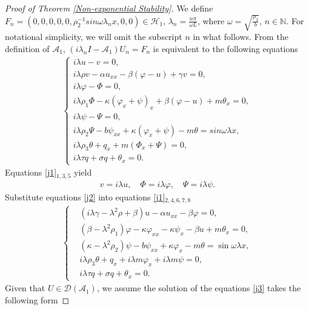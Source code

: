 \documentclass[11pt,reqno]{article}
\begin{document}
\begin{proof}[Proof of Theorem \ref{Non-exponential Stability}]
  	We define $F_n=(0,0,0,0,0,\rho_2 ^{-1}sin\omega \lambda_n x,0,0) \in \mathcal{H}_1$, $\lambda_n = \frac{n\pi}{\omega L}$, where $\omega=\sqrt{\frac{\rho_2}{b}}$, $n \in \mathbb{N}$. For notational simplicity, we will omit the subscript $n$ in what follows. From the definition of $\mathcal{A}_1$, $(i\lambda_n I-\mathcal{A}_1)U_n = F_n$ is equivalent to the following equations
  	\begin{align}\label{j1}
  		\begin{cases}
  			i\lambda u - v=0,\\
  			i\lambda \rho v -\alpha u_{xx}-\beta(\varphi - u)+ \gamma v =0,\\
  			i\lambda\varphi - \Phi =0,\\
  			i\lambda\rho_1 \Phi - \kappa(\varphi_{x}+\psi)_x + \beta (\varphi - u) +  m\theta_{x}=0  ,\\
  			i\lambda \psi - \Psi =0 ,\\
  			i\lambda \rho_2 \Psi - b \psi_{xx} + \kappa(\varphi_{x} + \psi) - m\theta =sin\omega\lambda x ,\\
  			i\lambda \rho_3 \theta + q_x + m(\Phi_{x} + \Psi) =0 ,\\
  			i\lambda \tau q + \sigma q + \theta_x = 0 .
  		\end{cases}
  	\end{align}
  	Equations \eqref{j1}$_{1,3,5}$ yield
  	\begin{align}\label{j2}
  		 v = i \lambda u, \quad \Phi = i \lambda \varphi, \quad \Psi = i \lambda \psi .
  	\end{align}
  	Substitute equations \eqref{j2} into equations \eqref{j1}$_{2,4,6,7,8}$
  	\begin{align}\label{j3}
  		\begin{cases}
  			& (i \lambda \gamma - \lambda^2 \rho + \beta) u - \alpha u_{xx} - \beta \varphi = 0, \\
  			&(\beta - \lambda^2 \rho_1) \varphi - \kappa \varphi_{xx} - \kappa \psi_x - \beta u + m \theta_x = 0, \\
  			&(\kappa - \lambda^2 \rho_2) \psi - b \psi_{xx} + \kappa \varphi_x - m \theta = \sin \omega \lambda x,\\
  			& i \lambda \rho_3 \theta + q_x + i\lambda m \varphi_x + i\lambda m\psi = 0, \\
  			& i\lambda \tau q + \sigma q + \theta_x = 0.
  		\end{cases}
  	\end{align}
  	Given that $U \in \mathcal{D}(\mathcal{A}_1)$, we assume the solution of the equations \eqref{j3} takes the following form

\end{proof}
\end{document}
